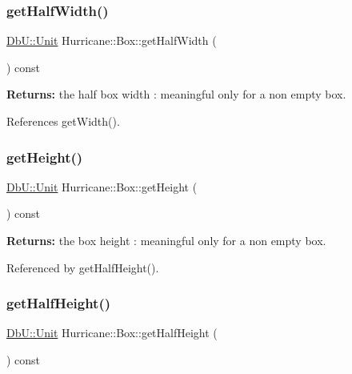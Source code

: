 \subsubsection{\texorpdfstring{get\+Half\+Width()}{getHalfWidth()}}
{\footnotesize\ttfamily \hyperlink{group__DbUGroup_ga4fbfa3e8c89347af76c9628ea06c4146}{Db\+U\+::\+Unit} Hurricane\+::\+Box\+::get\+Half\+Width (\begin{DoxyParamCaption}{ }\end{DoxyParamCaption}) const\hspace{0.3cm}{\ttfamily [inline]}}

{\bfseries Returns\+:} the half box width \+: meaningful only for a non empty box. 

References get\+Width().

\mbox{\label{classHurricane_1_1Box_a7b15b9488d49da1fc666c0383fb213ab}} 
\subsubsection{\texorpdfstring{get\+Height()}{getHeight()}}
{\footnotesize\ttfamily \hyperlink{group__DbUGroup_ga4fbfa3e8c89347af76c9628ea06c4146}{Db\+U\+::\+Unit} Hurricane\+::\+Box\+::get\+Height (\begin{DoxyParamCaption}{ }\end{DoxyParamCaption}) const\hspace{0.3cm}{\ttfamily [inline]}}

{\bfseries Returns\+:} the box height \+: meaningful only for a non empty box. 

Referenced by get\+Half\+Height().

\mbox{\label{classHurricane_1_1Box_a5c94554a78398c4a5c7dedd024926abb}} 
\subsubsection{\texorpdfstring{get\+Half\+Height()}{getHalfHeight()}}
{\footnotesize\ttfamily \hyperlink{group__DbUGroup_ga4fbfa3e8c89347af76c9628ea06c4146}{Db\+U\+::\+Unit} Hurricane\+::\+Box\+::get\+Half\+Height (\begin{DoxyParamCaption}{ }\end{DoxyParamCaption}) const\hspace{0.3cm}{\ttfamily [inline]}}

